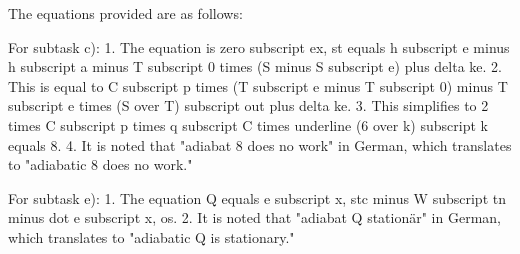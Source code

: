 The equations provided are as follows:

For subtask c):
1. The equation is zero subscript ex, st equals h subscript e minus h subscript a minus T subscript 0 times (S minus S subscript e) plus delta ke.
2. This is equal to C subscript p times (T subscript e minus T subscript 0) minus T subscript e times (S over T) subscript out plus delta ke.
3. This simplifies to 2 times C subscript p times q subscript C times underline (6 over k) subscript k equals 8.
4. It is noted that "adiabat 8 does no work" in German, which translates to "adiabatic 8 does no work."

For subtask e):
1. The equation Q equals e subscript x, stc minus W subscript tn minus dot e subscript x, os.
2. It is noted that "adiabat Q stationär" in German, which translates to "adiabatic Q is stationary."